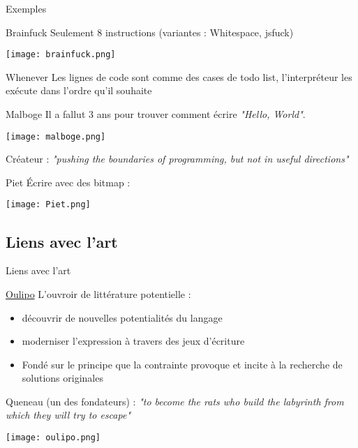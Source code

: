 \documentclass[xcolor={dvipsnames,svgnames}]{beamer}
\begin{document}
\begin{frame}{Exemples}
	\begin{block}{Brainfuck}
		Seulement 8 instructions (variantes : Whitespace, jsfuck)
		\begin{center}
			\texttt{[image: brainfuck.png]}
		\end{center}
	\end{block}
	\begin{block}{Whenever}
		Les lignes de code sont comme des cases de todo list, l'interpréteur les exécute dans l'ordre qu'il souhaite
	\end{block}
\end{frame}

\begin{frame}
	\begin{block}{Malboge}
		Il a fallut 3 ans pour trouver comment écrire \emph{"Hello, World"}.	
		\begin{center}
			\texttt{[image: malboge.png]}
		\end{center}
		Créateur : \emph{"pushing the boundaries of programming, but not in useful directions"}
	\end{block}
	
	\begin{block}{Piet}
		Écrire avec des bitmap :
		\begin{center}
			\texttt{[image: Piet.png]}
		\end{center}
	\end{block}
\end{frame}

\subsection{Liens avec l'art}
\begin{frame}{Liens avec l'art}
	\begin{block}{\href{https://fr.wikipedia.org/wiki/Oulipo}{Oulipo}}
		L'ouvroir de littérature potentielle :
		\begin{itemize}
			\item découvrir de nouvelles potentialités du langage
			\item moderniser l'expression à travers des jeux d'écriture
			\item Fondé sur le principe que la contrainte provoque et incite à la recherche de solutions originales
		\end{itemize}

		Queneau (un des fondateurs) : \emph{"to become the rats who build the labyrinth from which they will try to escape"}

		\begin{center}
			\texttt{[image: oulipo.png]}
		\end{center}
	\end{block}
\end{frame}
\end{document}
